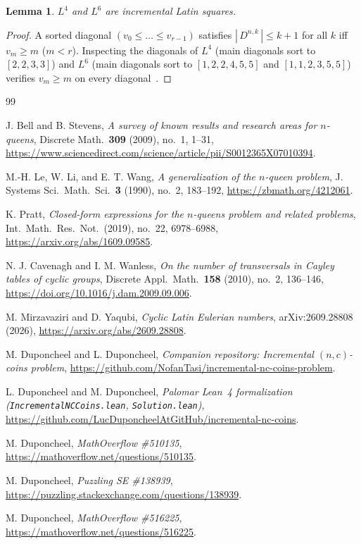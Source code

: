\documentclass[10pt,a4paper]{article}
\newtheorem{lemma}[theorem]{Lemma}
\theoremstyle{remark}
\begin{document}
\begin{lemma}\label{lem:L4L6}
$L^4$ and $L^6$ are incremental Latin squares.
\end{lemma}

\begin{proof}
A sorted diagonal $(v_0 \le \dots \le v_{r-1})$ satisfies $|\,D^{n,k}\,| \le k + 1$ for all $k$ iff
$v_m \ge m$ ($m < r$). Inspecting the diagonals of $L^4$ (main diagonals sort to $[2,2,3,3]$) and
$L^6$ (main diagonals sort to $[1,2,2,4,5,5]$ and $[1,1,2,3,5,5]$) verifies $v_m \ge m$ on every
diagonal~\cite{PalomarLean,CompanionRepo}.
\end{proof}

\begin{thebibliography}{99}
\raggedright
{}
J. Bell and B. Stevens,
\emph{A survey of known results and research areas for $n$-queens},
Discrete Math.\ \textbf{309} (2009), no.~1, 1--31,
\url{https://www.sciencedirect.com/science/article/pii/S0012365X07010394}.

M.-H. Le, W. Li, and E. T. Wang,
\emph{A generalization of the $n$-queen problem},
J. Systems Sci.\ Math.\ Sci.\ \textbf{3} (1990), no.~2, 183--192,
\url{https://zbmath.org/4212061}.

K. Pratt,
\emph{Closed-form expressions for the $n$-queens problem and related problems},
Int.\ Math.\ Res.\ Not.\ (2019), no.~22, 6978--6988,
\url{https://arxiv.org/abs/1609.09585}.

N. J. Cavenagh and I. M. Wanless,
\emph{On the number of transversals in Cayley tables of cyclic groups},
Discrete Appl.\ Math.\ \textbf{158} (2010), no.~2, 136--146,
\url{https://doi.org/10.1016/j.dam.2009.09.006}.

M. Mirzavaziri and D. Yaqubi,
\emph{Cyclic Latin Eulerian numbers},
arXiv:2609.28808 (2026),
\url{https://arxiv.org/abs/2609.28808}.

M. Duponcheel and L. Duponcheel,
\emph{Companion repository: Incremental $(n,c)$-coins problem},
\url{https://github.com/NofanTasi/incremental-nc-coins-problem}.

L. Duponcheel and M. Duponcheel,
\emph{Palomar Lean~4 formalization (\texttt{IncrementalNCCoins.lean}, \texttt{Solution.lean})},
\url{https://github.com/LucDuponcheelAtGitHub/incremental-nc-coins}.

M. Duponcheel, \emph{MathOverflow \#510135}, \url{https://mathoverflow.net/questions/510135}.

M. Duponcheel, \emph{Puzzling SE \#138939}, \url{https://puzzling.stackexchange.com/questions/138939}.

M. Duponcheel, \emph{MathOverflow \#516225}, \url{https://mathoverflow.net/questions/516225}.
\end{thebibliography}
\end{document}
